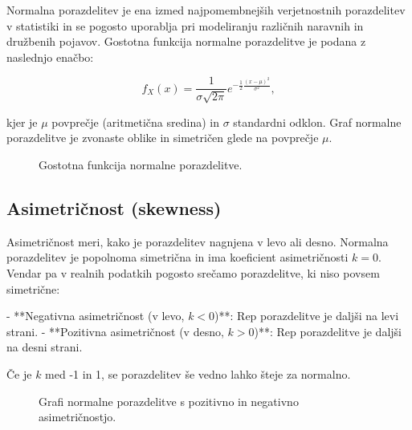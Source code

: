 Normalna porazdelitev je ena izmed najpomembnejših verjetnostnih porazdelitev v statistiki in se pogosto uporablja pri modeliranju različnih naravnih in družbenih pojavov. Gostotna funkcija normalne porazdelitve je podana z naslednjo enačbo:

\[f_X(x) = \frac{1}{\sigma\sqrt{2\pi}} e^{-\frac{1}{2} \frac{(x-\mu)^2}{\sigma^2}},\]

kjer je $\mu$ povprečje (aritmetična sredina) in $\sigma$ standardni odklon. Graf normalne porazdelitve je zvonaste oblike in simetričen glede na povprečje $\mu$.

\begin{figure}
\centering
{}
\caption{Gostotna funkcija normalne porazdelitve.}
\end{figure}

\subsection{Asimetričnost (skewness)}

Asimetričnost meri, kako je porazdelitev nagnjena v levo ali desno. Normalna porazdelitev je popolnoma simetrična in ima koeficient asimetričnosti $k = 0$. Vendar pa v realnih podatkih pogosto srečamo porazdelitve, ki niso povsem simetrične:

- **Negativna asimetričnost (v levo, $k < 0$)**: Rep porazdelitve je daljši na levi strani.
- **Pozitivna asimetričnost (v desno, $k > 0$)**: Rep porazdelitve je daljši na desni strani.

Če je $k$ med -1 in 1, se porazdelitev še vedno lahko šteje za normalno.

\begin{figure}
\centering
{}
\caption{Grafi normalne porazdelitve s pozitivno in negativno asimetričnostjo.}
\end{figure}

